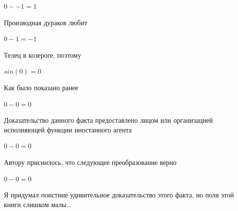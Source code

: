 \documentclass[12pt,a4paper,fleqn]{article}
\begin{document}
\begin{center}
\begin{center}
\begin{center}
\begin{center}
\begin{center}
\begin{center}
\begin{center}
\begin{center}
\begin{center}
\begin{center}
\begin{center}
\begin{center}
\begin{center}
\begin{center}
\begin{center}
\begin{center}
\begin{center}
\begin{center}
\begin{center}
\begin{center}
\begin{center}
\begin{center}
\begin{center}
\begin{center}
\begin{center}
\begin{center}
\begin{center}
\begin{center}
\begin{center}
\begin{center}
\begin{center}
\begin{center}
\begin{center}
\begin{center}
\begin{center}
\begin{center}
\begin{center}
\begin{center}
\begin{center}
\begin{center}
\begin{center}
\begin{center}
\begin{center}
\begin{center}
\begin{center}
\begin{center}
\begin{center}
\begin{center}
\begin{center}
\begin{center}
\begin{center}
\begin{center}
\begin{center}
\begin{center}
\begin{center}
\begin{center}
\begin{center}
\begin{center}
\begin{center}$0--1 = 1$\end{center}
Производная дураков любит\cite{link2}

\begin{center}
\begin{center}$0-1 = -1$\end{center}
Телец в козероге, поэтому

\begin{center}
\begin{center}$sin(0) = 0$\end{center}
Как было показано ранее

\begin{center}
\begin{center}$0-0 = 0$\end{center}
Доказательство данного факта предоставлено лицом или организацией исполняющей функции иностанного агента

\begin{center}
\begin{center}$0-0 = 0$\end{center}
Автору приснилось, что следующее преобразование верно

\begin{center}
\begin{center}$0-0 = 0$\end{center}
Я придумал поистине удивительное доказательство этого факта, но поля этой книги слишком малы\ldots


\end{center}
\end{center}
\end{center}
\end{center}
\end{center}
\end{center}
\end{center}
\end{center}
\end{center}
\end{center}
\end{center}
\end{center}
\end{center}
\end{center}
\end{center}
\end{center}
\end{center}
\end{center}
\end{center}
\end{center}
\end{center}
\end{center}
\end{center}
\end{center}
\end{center}
\end{center}
\end{center}
\end{center}
\end{center}
\end{center}
\end{center}
\end{center}
\end{center}
\end{center}
\end{center}
\end{center}
\end{center}
\end{center}
\end{center}
\end{center}
\end{center}
\end{center}
\end{center}
\end{center}
\end{center}
\end{center}
\end{center}
\end{center}
\end{center}
\end{center}
\end{center}
\end{center}
\end{center}
\end{center}
\end{center}
\end{center}
\end{center}
\end{center}
\end{center}
\end{center}
\end{center}
\end{center}
\end{center}
\end{document}
